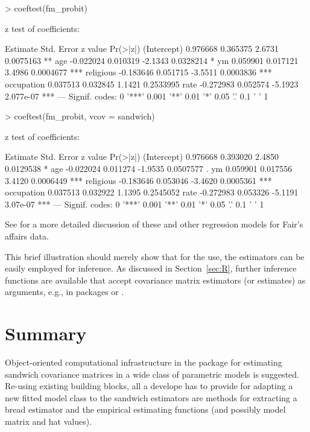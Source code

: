 \documentclass{Z}
\begin{document}
\begin{Schunk}
\begin{Sinput}
> coeftest(fm_probit)
\end{Sinput}
\begin{Soutput}
z test of coefficients:

             Estimate Std. Error z value  Pr(>|z|)    
(Intercept)  0.976668   0.365375  2.6731 0.0075163 ** 
age         -0.022024   0.010319 -2.1343 0.0328214 *  
ym           0.059901   0.017121  3.4986 0.0004677 ***
religious   -0.183646   0.051715 -3.5511 0.0003836 ***
occupation   0.037513   0.032845  1.1421 0.2533995    
rate        -0.272983   0.052574 -5.1923 2.077e-07 ***
---
Signif. codes:  0 '***' 0.001 '**' 0.01 '*' 0.05 '.' 0.1 ' ' 1 
\end{Soutput}
\begin{Sinput}
> coeftest(fm_probit, vcov = sandwich)
\end{Sinput}
\begin{Soutput}
z test of coefficients:

             Estimate Std. Error z value  Pr(>|z|)    
(Intercept)  0.976668   0.393020  2.4850 0.0129538 *  
age         -0.022024   0.011274 -1.9535 0.0507577 .  
ym           0.059901   0.017556  3.4120 0.0006449 ***
religious   -0.183646   0.053046 -3.4620 0.0005361 ***
occupation   0.037513   0.032922  1.1395 0.2545052    
rate        -0.272983   0.053326 -5.1191  3.07e-07 ***
---
Signif. codes:  0 '***' 0.001 '**' 0.01 '*' 0.05 '.' 0.1 ' ' 1 
\end{Soutput}
\end{Schunk}

See \cite{hac:Greene:2003} for a more detailed discussion of these and other
regression models for Fair's affairs data.

This brief illustration should merely show that for the use, the
estimators can be easily employed for inference. As discussed in Section~\ref{sec:R},
further inference functions are available that accept covariance matrix estimators
(or estimates) as arguments, e.g., in packages  or .

\section{Summary} \label{sec:summary}

Object-oriented computational infrastructure in the  package 
for estimating sandwich covariance matrices in a wide class of parametric models is suggested.
Re-using existing building blocks, all a develope has to provide for adapting
a new fitted model class to the sandwich estimators are methods for extracting a bread
estimator and the empirical estimating functions (and possibly model matrix and hat values).
\end{document}
